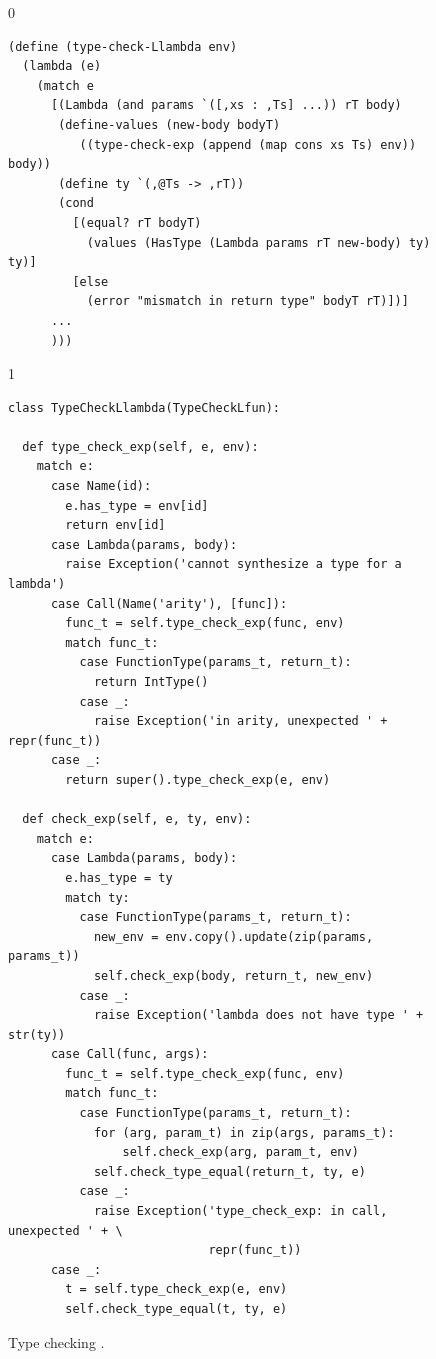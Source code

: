 \documentclass[7x10]{TimesAPriori_MIT}%
\def\racketEd{0}
\def\pythonEd{1}
\def\edition{1}
\newcommand{\pythonColor}[0]{}
\newcommand{\python}[1]{{\if\edition\pythonEd\pythonColor #1\fi}}
\numberwithin{theorem}{chapter}
\numberwithin{definition}{chapter}
\numberwithin{equation}{chapter}
\begin{document}
\begin{figure}[tbp]
  \begin{tcolorbox}[colback=white]
    {\if\edition\racketEd 
\begin{lstlisting}
(define (type-check-Llambda env)
  (lambda (e)
    (match e
      [(Lambda (and params `([,xs : ,Ts] ...)) rT body)
       (define-values (new-body bodyT) 
          ((type-check-exp (append (map cons xs Ts) env)) body))
       (define ty `(,@Ts -> ,rT))
       (cond
         [(equal? rT bodyT)
           (values (HasType (Lambda params rT new-body) ty) ty)]
         [else
           (error "mismatch in return type" bodyT rT)])]
      ...
      )))
\end{lstlisting}
\fi}
{\if\edition\pythonEd\pythonColor 
\begin{lstlisting}
class TypeCheckLlambda(TypeCheckLfun):

  def type_check_exp(self, e, env):
    match e:
      case Name(id):
        e.has_type = env[id]
        return env[id]
      case Lambda(params, body):
        raise Exception('cannot synthesize a type for a lambda')
      case Call(Name('arity'), [func]):
        func_t = self.type_check_exp(func, env)
        match func_t:
          case FunctionType(params_t, return_t):
            return IntType()
          case _:
            raise Exception('in arity, unexpected ' + repr(func_t))
      case _:
        return super().type_check_exp(e, env)
    
  def check_exp(self, e, ty, env):
    match e:
      case Lambda(params, body):
        e.has_type = ty
        match ty:
          case FunctionType(params_t, return_t):
            new_env = env.copy().update(zip(params, params_t))
            self.check_exp(body, return_t, new_env)
          case _:
            raise Exception('lambda does not have type ' + str(ty))
      case Call(func, args):
        func_t = self.type_check_exp(func, env)
        match func_t:
          case FunctionType(params_t, return_t):
            for (arg, param_t) in zip(args, params_t):
                self.check_exp(arg, param_t, env)
            self.check_type_equal(return_t, ty, e)
          case _:
            raise Exception('type_check_exp: in call, unexpected ' + \
                            repr(func_t))
      case _:
        t = self.type_check_exp(e, env)
        self.check_type_equal(t, ty, e)
\end{lstlisting}
\fi}
  \end{tcolorbox}

  \caption{Type checking \LangLam{}\python{, part 1}.}
\label{fig:type-check-Llambda}
\end{figure}
\end{document}
